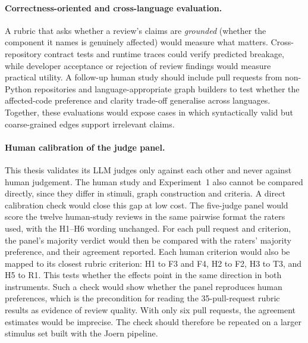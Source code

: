 \paragraph{Correctness-oriented and cross-language evaluation.} A rubric that
asks whether a review's claims are \emph{grounded} (whether the component it
names is genuinely affected) would measure what matters. Cross-repository
contract tests and runtime traces could verify predicted breakage, while
developer acceptance or rejection of review findings would measure practical
utility. A follow-up human study should include pull requests from non-Python
repositories and language-appropriate graph builders to test whether the
affected-code preference and clarity trade-off generalise across languages.
Together, these evaluations would expose cases in which syntactically valid
but coarse-grained edges support irrelevant claims.

\paragraph{Human calibration of the judge panel.}
This thesis validates its LLM judges only against each other and never
against human judgement. The human study and Experiment~1 also cannot be
compared directly, since they differ in stimuli, graph construction and
criteria. A direct calibration check would close this gap at low cost. The
five-judge panel would score the twelve human-study reviews in the same
pairwise format the raters used, with the H1--H6 wording unchanged. For each
pull request and criterion, the panel's majority verdict would then be
compared with the raters' majority preference, and their agreement reported.
Each human criterion would also be mapped to its closest rubric criterion: H1
to F3 and F4, H2 to F2, H3 to T3, and H5 to R1. This tests whether the
effects point in the same direction in both instruments. Such a check would
show whether the panel reproduces human preferences, which is the
precondition for reading the 35-pull-request rubric results as evidence of
review quality. With only six pull requests, the agreement estimates would be
imprecise. The check should therefore be repeated on a larger stimulus set
built with the Joern pipeline.
